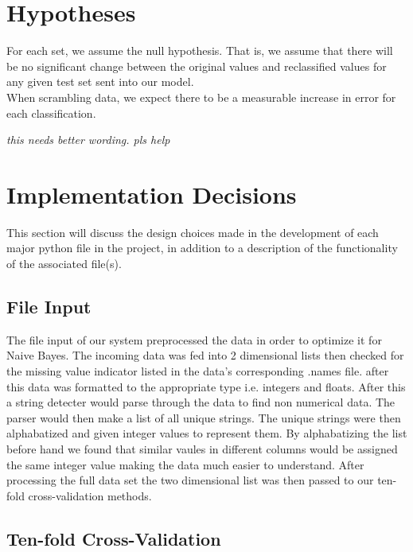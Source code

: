 \documentclass[twoside,11pt]{article}
\begin{document}
\section{Hypotheses}

For each set, we assume the null hypothesis. That is, we assume that there will be no 
significant change between the original values and reclassified values for any given test
set sent into our model.\\

When scrambling data, we expect there to be a measurable increase in error for each classification.

\emph{this needs better wording. pls help}\\
\section{Implementation Decisions}

This section will discuss the design choices made in the development of each major 
python file in the project, in addition to a description of the functionality of 
the associated file(s).

\subsection{File Input}
The file input of our system preprocessed the data in order to optimize it for Naive Bayes. 
The incoming data was fed into 2 dimensional lists then checked for the missing value indicator
listed in the data's corresponding .names file. after this data was formatted to the appropriate 
type i.e. integers and floats. After this a string detecter would parse through the data to find
non numerical data. The parser would then make a list of all unique strings. The unique strings 
were then alphabatized and given integer values to represent them. By alphabatizing the list
before hand we found that similar vaules in different columns would be assigned the same integer
value making the data much easier to understand. After processing the full data set the two 
dimensional list was then passed to our ten-fold cross-validation methods.  
\subsection{Ten-fold Cross-Validation}
\end{document}
